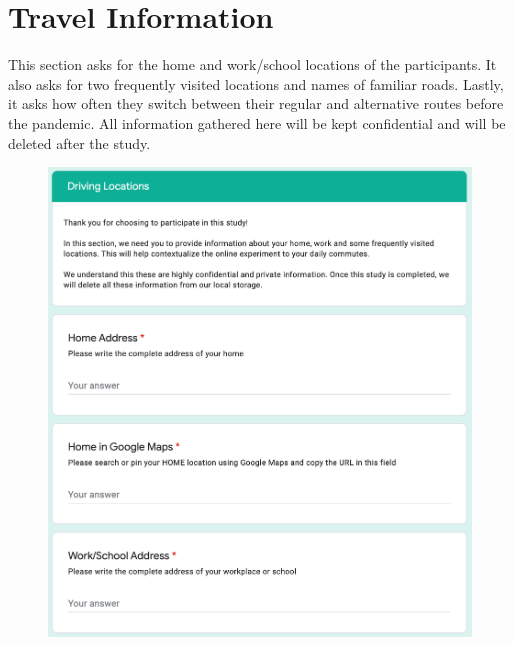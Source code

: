 \section{Travel Information}
This section asks for the home and work/school locations of the participants. It also asks for two frequently visited locations and names of familiar roads. Lastly, it asks how often they switch between their regular and alternative routes before the pandemic. All information gathered here will be kept confidential and will be deleted after the study. 
\begin{figure}[h]
  \centering
  \includegraphics[scale=0.6]{figures/d-travel1.png}
\end{figure}

